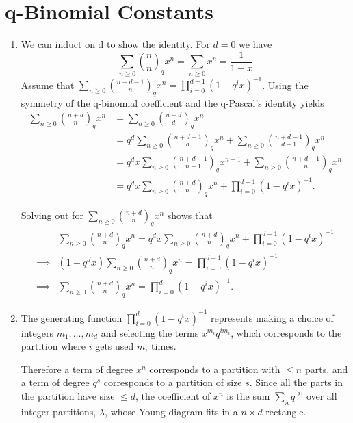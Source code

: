 \documentclass{article}
\newcommand{\qbinom}[2]{\binom{#1}{#2}_{q}}
\begin{document}
\section{q-Binomial Constants}
\begin{enumerate}
   \item 
      We can induct on d to show the identity.
      For $d=0$ we have 
      \[
         \sum_{n \geq 0} \qbinom{n}{n} x^n 
         = \sum_{n \geq 0} x^n
         = \frac{1}{1-x}
      \]
      Assume that $\sum_{n \geq 0} \qbinom{n+d-1}{n} x^n 
      = \prod_{i=0}^{d-1} (1-q^ix)^{-1}$.
      Using the symmetry of the q-binomial coefficient
      and the q-Pascal's identity yields
      \begin{align*}
         \sum_{n \geq 0} \qbinom{n+d}{n} x^n 
         &= \sum_{n \geq 0} \qbinom{n+d}{d} x^n \\
         &= q^d\sum_{n \geq 0} \qbinom{n+d-1}{d} x^n 
            + \sum_{n \geq 0} \qbinom{n+d-1}{d-1} x^n \\
         &= q^dx\sum_{n \geq 0} \qbinom{n+d-1}{n-1} x^{n-1} 
            + \sum_{n \geq 0} \qbinom{n+d-1}{n} x^n \\
         &= q^dx \sum_{n \geq 0} \qbinom{n+d}{n} x^n
            + \prod_{i=0}^{d-1} (1-q^ix)^{-1}.
      \end{align*}

      Solving out for $\sum_{n \geq 0} \qbinom{n+d}{n} x^n$ shows that 
      \begin{align*}
         &\sum_{n \geq 0} \qbinom{n+d}{n} x^n 
            = q^dx \sum_{n \geq 0} \qbinom{n+d}{n} x^n
            + \prod_{i=0}^{d-1} (1-q^ix)^{-1} \\
         \implies &(1-q^dx)\sum_{n \geq 0} \qbinom{n+d}{n} x^n 
            = \prod_{i=0}^{d-1} (1-q^ix)^{-1} \\
         \implies &\sum_{n \geq 0} \qbinom{n+d}{n} x^n 
            = \prod_{i=0}^{d} (1-q^ix)^{-1}.
      \end{align*}
   \item 
      The generating function $\prod_{i=0}^{d} (1-q^ix)^{-1}$
      represents making a choice of integers $m_1, \hdots, m_d$ 
      and selecting the terms $x^{m_i}q^{im_i}$, 
      which corresponds to the partition where $i$ gets used $m_i$ times.

      Therefore a term of degree $x^n$ corresponds
      to a partition with $\leq n$ parts, and
      a term of degree $q^s$ corresponds
      to a partition of size $s$.
      Since all the parts in the partition have size $\leq d$,
      the coefficient of $x^n$ is the sum $\sum_{\lambda} q^{|\lambda|}$
      over all integer partitions, $\lambda$, whose Young diagram fits in 
      a $n \times d$ rectangle.
\end{enumerate}
\newpage 
\end{document}
